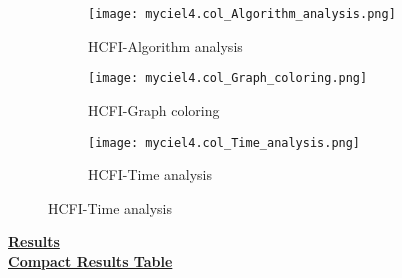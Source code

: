 \documentclass[10pt]{article}
\begin{document}
\graphicspath{{./Core1/Solutions/HCFI/myciel4.col}}
\begin{figure}[H]
\centering
\begin{subfigure}{.33\textwidth}
  \centering
  \texttt{[image: myciel4.col\_Algorithm\_analysis.png]}
  \caption{HCFI-Algorithm analysis}
   \label{fig:subfig1}
\end{subfigure}%
\begin{subfigure}{.33\textwidth}
  \centering
  \texttt{[image: myciel4.col\_Graph\_coloring.png]}
  \caption{HCFI-Graph coloring}
  \label{fig:subfig2}
\end{subfigure}
\begin{subfigure}{.33\textwidth}
  \centering
  \texttt{[image: myciel4.col\_Time\_analysis.png]}
  \caption{HCFI-Time analysis}
  \label{fig:subfig2}
\end{subfigure}
\end{figure}
\vspace{2cm}
\begin{center}
\hyperlink{page.8}{\textbf{Results}}\\
\vspace{0.5cm}
\hyperlink{page.71}{\textbf{Compact Results Table}}
\end{center}
\pagebreak
\end{document}
